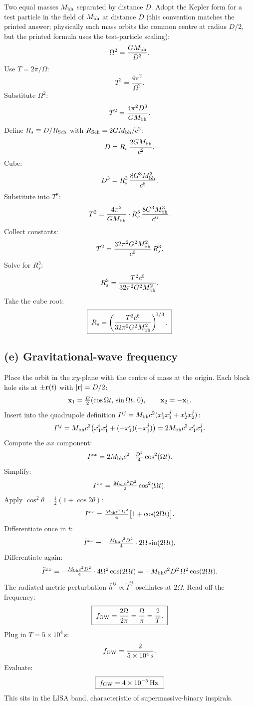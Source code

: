 \documentclass[11pt]{article}
\begin{document}
Two equal masses $M_{\rm bh}$ separated by distance $D$. Adopt the Kepler form for a test particle in the field of $M_{\rm bh}$ at distance $D$ (this convention matches the printed answer; physically each mass orbits the common centre at radius $D/2$, but the printed formula uses the test-particle scaling):
\[ \Omega^2 = \frac{G M_{\rm bh}}{D^3}. \]
Use $T = 2\pi/\Omega$:
\[ T^2 = \frac{4\pi^2}{\Omega^2}. \]
Substitute $\Omega^2$:
\[ T^2 = \frac{4\pi^2 D^3}{GM_{\rm bh}}. \]
Define $R_s \equiv D / R_{\rm Sch}$ with $R_{\rm Sch} = 2GM_{\rm bh}/c^2$:
\[ D = R_s\,\frac{2 G M_{\rm bh}}{c^2}. \]
Cube:
\[ D^3 = R_s^3\,\frac{8 G^3 M_{\rm bh}^3}{c^6}. \]
Substitute into $T^2$:
\[ T^2 = \frac{4\pi^2}{G M_{\rm bh}}\cdot R_s^3\,\frac{8 G^3 M_{\rm bh}^3}{c^6}. \]
Collect constants:
\[ T^2 = \frac{32\pi^2 G^2 M_{\rm bh}^2}{c^6}\,R_s^3. \]
Solve for $R_s^3$:
\[ R_s^3 = \frac{T^2 c^6}{32\pi^2 G^2 M_{\rm bh}^2}. \]
Take the cube root:
\begin{equation}
\boxed{\;R_s = \left(\frac{T^2 c^6}{32\pi^2 G^2 M_{\rm bh}^2}\right)^{\!1/3}.\;}
\label{eq:Rs}
\end{equation}

\subsection*{(e) Gravitational-wave frequency}

Place the orbit in the $xy$-plane with the centre of mass at the origin. Each black hole sits at $\pm \vb r(t)$ with $|\vb r| = D/2$:
\[ \vb x_1 = \tfrac{D}{2}(\cos\Omega t,\,\sin\Omega t,\,0),\qquad \vb x_2 = -\vb x_1. \]
Insert into the quadrupole definition $I^{ij} = M_{\rm bh}c^2(x_1^i x_1^j + x_2^i x_2^j)$:
\[ I^{ij} = M_{\rm bh}c^2\bigl(x_1^i x_1^j + (-x_1^i)(-x_1^j)\bigr) = 2 M_{\rm bh}c^2\,x_1^i x_1^j. \]
Compute the $xx$ component:
\[ I^{xx} = 2 M_{\rm bh}c^2\cdot \tfrac{D^2}{4}\cos^2(\Omega t). \]
Simplify:
\[ I^{xx} = \tfrac{M_{\rm bh}c^2 D^2}{2}\cos^2(\Omega t). \]
Apply $\cos^2\theta = \tfrac12(1+\cos 2\theta)$:
\[ I^{xx} = \tfrac{M_{\rm bh}c^2 D^2}{4}\bigl[1 + \cos(2\Omega t)\bigr]. \]
Differentiate once in $t$:
\[ \dot I^{xx} = -\tfrac{M_{\rm bh}c^2 D^2}{4}\cdot 2\Omega\sin(2\Omega t). \]
Differentiate again:
\[ \ddot I^{xx} = -\tfrac{M_{\rm bh}c^2 D^2}{4}\cdot 4\Omega^2\cos(2\Omega t) = -M_{\rm bh}c^2 D^2\,\Omega^2 \cos(2\Omega t). \]
The radiated metric perturbation $\bar h^{ij} \propto \ddot I^{ij}$ oscillates at $2\Omega$. Read off the frequency:
\begin{equation}
\boxed{\;f_{\rm GW} = \frac{2\Omega}{2\pi} = \frac{\Omega}{\pi} = \frac{2}{T}.\;}
\label{eq:fGW}
\end{equation}
Plug in $T = 5\times 10^4\,$s:
\[ f_{\rm GW} = \frac{2}{5\times 10^4\,\rm s}. \]
Evaluate:
\[ \boxed{\;f_{\rm GW} = 4\times 10^{-5}\,\rm Hz.\;} \]
This sits in the LISA band, characteristic of supermassive-binary inspirals.
\end{document}
